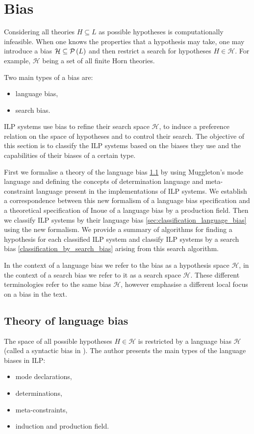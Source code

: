 \chapter{Bias\cite{nienhuys1997foundations}}\label{ch:bias}
Considering all theories $H \subseteq L$ as possible hypotheses is computationally infeasible. When one knows the properties that a hypothesis may take, one may introduce a bias $\mathcal{H} \subseteq \mathcal{P} \left({ L }\right)$ and then restrict a search for hypotheses $H \in \mathcal{H}$. For example, $\mathcal{H}$ being a set of all finite Horn theories.

Two main types of a bias are:
\begin{itemize}
\item language bias,
\item search bias.
\end{itemize}

ILP systems use bias to refine their search space $\mathcal{H}$, to induce a preference relation on the space of hypotheses and to control their search. The objective of this section is to classify the ILP systems based on the biases they use and the capabilities of their biases of a certain type.

First we formalise a theory of the language bias \ref{sec:background_language_bias} by using Muggleton's mode language and defining the concepts of determination language and meta-constraint language present in the implementations of ILP systems.
We establish a correspondence between this new formalism of a language bias specification and a theoretical specification of Inoue \cite{inoue1992linear} of a language bias by a production field. Then we classify ILP systems by their language bias \ref{sec:classification_language_bias} using the new formalism.
We provide a summary of algorithms for finding a hypothesis for each classified ILP system and classify ILP systems by a search bias \ref{classification_by_search_bias} arising from this search algorithm.

In the context of a language bias we refer to the bias as a hypothesis space $\mathcal{H}$, in the context of a search bias we refer to it as a search space $\mathcal{H}$.
These different terminologies refer to the same bias $\mathcal{H}$, however emphasise a different local focus on a bias in the text.

\section{Theory of language bias}\label{sec:background_language_bias}
The space of all possible hypotheses $H \in \mathcal{H}$ is restricted by a language bias $\mathcal{H}$ (called a syntactic bias in \cite{muggleton1994inductive}). The author presents the main types of the language biases in ILP:
\begin{itemize}
\item mode declarations,
\item determinations,
\item meta-constraints,
\item induction and production field.
\end{itemize}


